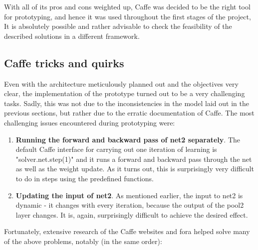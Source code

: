 \documentclass[a4paper, 12pt]{article}
\numberwithin{equation}{section}
\begin{document}
	With all of its pros and cons weighted up, Caffe was decided to be the right tool for prototyping, and hence it was used throughout the first stages of the project, It is absolutely possible and rather advisable to check the feasibility of the described solutions in a different framework.
	
	\subsection{Caffe tricks and quirks} \label{sec:caffe_tricks}
	
	Even with the architecture meticulously planned out and the objectives very clear, the implementation of the prototype turned out to be a very challenging tasks. Sadly, this was not due to the inconsistencies in the model laid out in the previous sections, but rather due to the erratic documentation of Caffe. The most challenging issues encountered during prototyping were:
	
	\begin{enumerate}
		\item \textbf{Running the forward and backward pass of net2 separately}. The default Caffe interface for carrying out one iteration of learning is "solver.net.step(1)" and it runs a forward and backward pass through the net as well as the weight update. As it turns out, this is surprisingly very difficult to do in steps using the predefined functions.
		\item \textbf{Updating the input of net2}. As mentioned earlier, the input to net2 is dynamic - it changes with every iteration, because the output of the pool2 layer changes. It is, again, surprisingly difficult to achieve the desired effect.
	\end{enumerate}
	
	Fortunately, extensive research of the Caffe websites and fora helped solve many of the above problems, notably (in the same order):
	
\end{document}
